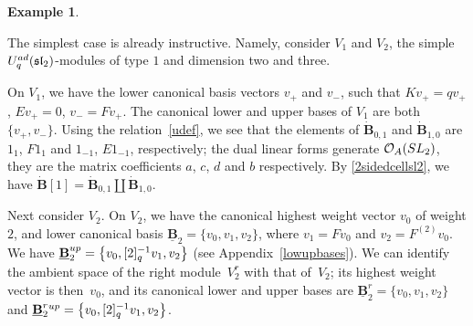 \documentclass[11pt]{article}
\numberwithin{equation}{section}
\numberwithin{equation}{section}
\theoremstyle{definition}
\newtheorem{exa}[teo]{Example}
\newcommand{\Oo}{{\mathcal O}}
\begin{document}
\begin{exa}\label{V2V20}{\rm The simplest case is already instructive. Namely, consider $V_1$ and $V_2$, the simple $U_q^{\rm ad}({\mathfrak{sl}_2})$-modules of type $1$ and dimension two and three.

On $V_1$, we have the lower canonical basis vectors $v_+$ and $v_-$, such that $Kv_+ = qv_+$, $Ev_+=0$, $v_- = Fv_+$. The canonical lower and upper bases of $V_1$ are both $\{v_+,v_-\}$. Using the relation~\eqref{udef}, we see that the elements of $\dot{\mathbf{B}}_{0,1}$ and $\dot{\mathbf{B}}_{1,0}$ are $1_1$, $F1_1$ and $1_{-1}$, $E1_{-1}$, respectively; the dual linear forms generate $\Oo_A({\rm SL}_2)$, they are the matrix coefficients $a$, $c$, $d$ and $b$ respectively. By \eqref{2sidedcellsl2}, we have $\dot{\mathbf{B}} [1] = \dot{\mathbf{B}}_{0,1}\coprod \dot{\mathbf{B}}_{1,0}$.

Next consider $V_2$. On $V_2$, we have the canonical highest weight vector $v_0$ of weight $2$, and lower canonical basis $\underline{\mathbf{B}}_{2}=\{v_0,v_1,v_2\}$, where $v_1=Fv_0$ and $v_2=F^{(2)}v_0$. We have ${\underline{\mathbf{B}}_{2}^{\rm up}=\big\{v_0,[2]_q^{-1}v_1,v_2\big\}}$ (see Appendix~\ref{lowupbases}). We can identify the ambient space of the right module~$V_2^r$ with that of~$V_2$; its highest weight vector is then~$v_0$, and its canonical lower and upper bases are $\underline{\mathbf{B}}_{2}^r=\{v_0,v_1,v_2\}$ and $\underline{\mathbf{B}}_{2}^r{}^{\rm up}=\big\{v_0,[2]_q^{-1}v_1,v_2\big\}$.

}
\end{exa}
\end{document}
